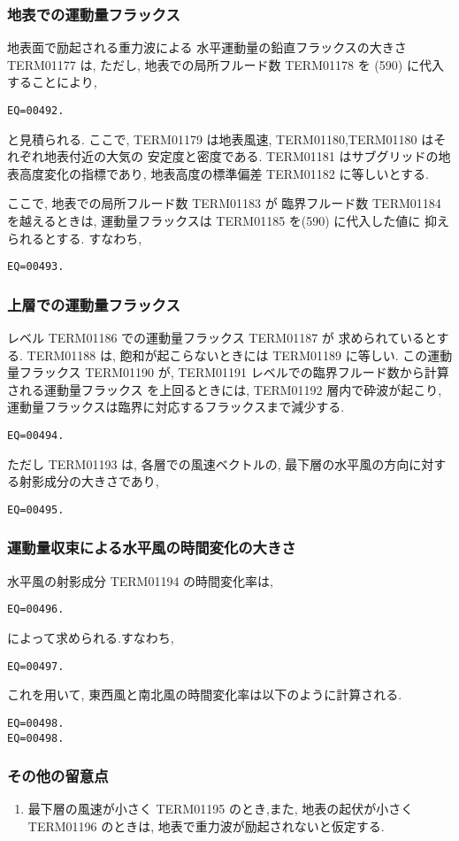 \subsubsection{地表での運動量フラックス}

地表面で励起される重力波による
水平運動量の鉛直フラックスの大きさ TERM01177 は,
ただし, 地表での局所フルード数 
TERM01178 を
(590) に代入することにより,
%
\begin{verbatim}
EQ=00492.
\end{verbatim}
%
と見積られる.
ここで, 
TERM01179 は地表風速,
TERM01180,TERM01180 はそれぞれ地表付近の大気の
安定度と密度である.
TERM01181 はサブグリッドの地表高度変化の指標であり,
地表高度の標準偏差 TERM01182 に等しいとする.

ここで, 地表での局所フルード数 
TERM01183 が 臨界フルード数
TERM01184 を越えるときは, 
運動量フラックスは TERM01185 を(590) に代入した値に
抑えられるとする.
すなわち,
\begin{verbatim}
EQ=00493.
\end{verbatim}

\subsubsection{上層での運動量フラックス}

レベル TERM01186 での運動量フラックス TERM01187 が
求められているとする.
TERM01188 は, 飽和が起こらないときには
TERM01189 に等しい.
この運動量フラックス TERM01190 が,
TERM01191 レベルでの臨界フルード数から計算される運動量フラックス
を上回るときには, TERM01192 層内で砕波が起こり,
運動量フラックスは臨界に対応するフラックスまで減少する.

\begin{verbatim}
EQ=00494.
\end{verbatim}

ただし TERM01193 は,
各層での風速ベクトルの,
最下層の水平風の方向に対する射影成分の大きさであり,
\begin{verbatim}
EQ=00495.
\end{verbatim}

\subsubsection{運動量収束による水平風の時間変化の大きさ}

水平風の射影成分 TERM01194 の時間変化率は,
\begin{verbatim}
EQ=00496.
\end{verbatim}
%
によって求められる.すなわち,
%
\begin{verbatim}
EQ=00497.
\end{verbatim}
%
これを用いて,
東西風と南北風の時間変化率は以下のように計算される.
\begin{verbatim}
EQ=00498.
EQ=00498.
\end{verbatim}

\subsubsection{その他の留意点}

\begin{enumerate}
\item 最下層の風速が小さく TERM01195 のとき,また,
      地表の起伏が小さく TERM01196 のときは, 
      地表で重力波が励起されないと仮定する.
\end{enumerate}

